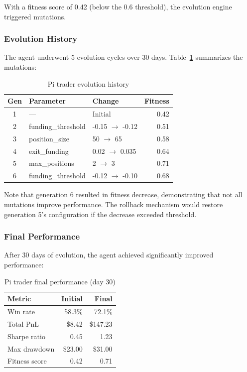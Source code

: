 \documentclass{article}
\begin{document}
With a fitness score of 0.42 (below the 0.6 threshold), the evolution engine triggered mutations.

\subsubsection{Evolution History}

The agent underwent 5 evolution cycles over 30 days. Table~\ref{tab:pi_evolution} summarizes the mutations:

\begin{table}[h]
\centering
\caption{Pi trader evolution history}
\label{tab:pi_evolution}
\small
\begin{tabular}{cllr}
\toprule
\textbf{Gen} & \textbf{Parameter} & \textbf{Change} & \textbf{Fitness} \\
\midrule
1 & --- & Initial & 0.42 \\
2 & funding\_threshold & -0.15 $\to$ -0.12 & 0.51 \\
3 & position\_size & 50 $\to$ 65 & 0.58 \\
4 & exit\_funding & 0.02 $\to$ 0.035 & 0.64 \\
5 & max\_positions & 2 $\to$ 3 & 0.71 \\
6 & funding\_threshold & -0.12 $\to$ -0.10 & 0.68 \\
\bottomrule
\end{tabular}
\end{table}

Note that generation 6 resulted in fitness decrease, demonstrating that not all mutations improve performance. The rollback mechanism would restore generation 5's configuration if the decrease exceeded threshold.

\subsubsection{Final Performance}

After 30 days of evolution, the agent achieved significantly improved performance:

\begin{table}[h]
\centering
\caption{Pi trader final performance (day 30)}
\label{tab:pi_final}
\begin{tabular}{lrr}
\toprule
\textbf{Metric} & \textbf{Initial} & \textbf{Final} \\
\midrule
Win rate & 58.3\% & 72.1\% \\
Total PnL & \$8.42 & \$147.23 \\
Sharpe ratio & 0.45 & 1.23 \\
Max drawdown & \$23.00 & \$31.00 \\
Fitness score & 0.42 & 0.71 \\
\bottomrule
\end{tabular}
\end{table}
\end{document}
